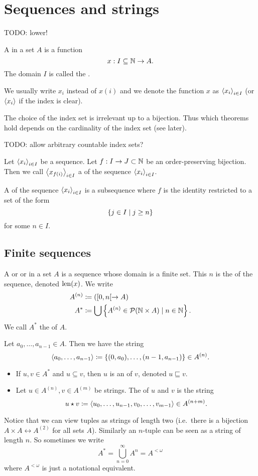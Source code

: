 \section{Sequences and strings}
TODO: lower!
\begin{definition}
A  in a set $A$ is a function
\[ x:I\subseteq\mathbb{N}\to A. \]
The domain $I$ is called the .

We usually write $x_i$ instead of $x(i)$ and we denote the function $x$ as $\left\langle x_i \right\rangle_{i\in I}$ (or $\left\langle x_i \right\rangle$ if the index is clear).
\end{definition}
The choice of the index set is irrelevant up to a bijection. Thus which theorems hold depends on the cardinality of the index set (see later).

TODO: allow arbitrary countable index sets?

\begin{definition}
Let $\left\langle x_i \right\rangle_{i\in I}$ be a sequence. Let $f:I\to J\subset \mathbb{N}$ be an order-preserving bijection. Then we call $\left\langle x_{f(i)} \right\rangle_{i\in I}$ a  of the sequence $\left\langle x_i \right\rangle_{i\in I}$.

A  of the sequence $\left\langle x_i \right\rangle_{i\in I}$ is a subsequence where $f$ is the identity restricted to a set of the form
\[ \left\{ j\in I \;\middle|\; j\geq n \right\} \]
for some $n\in I$.
\end{definition}

\subsection{Finite sequences}
\begin{definition}
A  or  or  in a set $A$ is a sequence whose domain is a finite set.
This $n$ is the  of the sequence, denoted $\operatorname{len}(x)$. We write
\begin{align*}
A^{(n)} &\coloneqq ([0,n[\to A) \\
A^* &\coloneqq \bigcup\left\{ A^{(n)}\in \operatorname{\mathcal{P}}(\mathbb{N}\times A) \;|\;n\in \mathbb{N} \right\}.
\end{align*}
We call $A^*$ the  of $A$.

Let $a_0,\ldots, a_{n-1}\in A$. Then we have the string
\[ \langle a_0,\ldots, a_{n-1}\rangle \coloneqq \{(0,a_0),\ldots, (n-1,a_{n-1})\} \in A^{(n)}. \]
\begin{itemize}
\item If $u,v\in A^*$ and $u\subseteq v$, then $u$ is an  of $v$, denoted $u \sqsubseteq v$.
\item Let $u\in A^{(n)}, v\in A^{(m)}$ be strings. The  of $u$ and $v$ is the string
\[ u\star v \coloneqq \langle u_0,\ldots, u_{n-1},v_0,\ldots, v_{m-1}\rangle \in A^{(n+m)}. \]
\end{itemize}
\end{definition}
Notice that we can view tuples as strings of length two (i.e.\ there is a bijection $A\times A \leftrightarrow A^{(2)}$ for all sets $A$). Similarly an $n$-tuple can be seen as a string of length $n$. So sometimes we write
\[ A^* = \bigcup^\infty_{n=0}A^n = A^{<\omega}\]
where $A^{<\omega}$ is just a notational equivalent.

